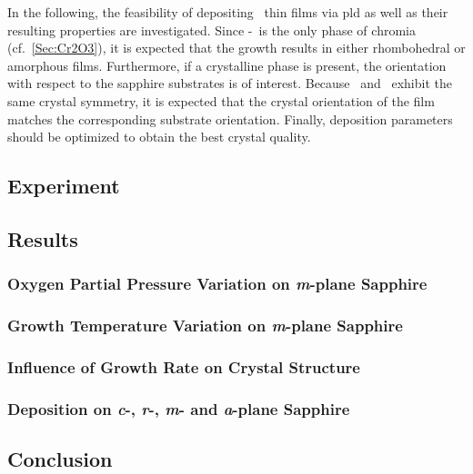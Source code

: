 In the following, the feasibility of depositing \cro\ thin films via \gls{pld} as well as their resulting properties are investigated.
Since \textalpha-\cro\ is the only phase of chromia (cf.~\ref{Sec:Cr2O3}), it is expected that the growth results in either rhombohedral or amorphous films.
Furthermore, if a crystalline phase is present, the orientation with respect to the sapphire substrates is of interest.
Because \alo\ and \cro\ exhibit the same crystal symmetry, it is expected that the crystal orientation of the film  matches the corresponding substrate orientation.
Finally, deposition parameters should be optimized to obtain the best crystal quality.

\subsection{Experiment}
    

\subsection{Results}
    \subsubsection{Oxygen Partial Pressure Variation on \textit{m}-plane Sapphire}
        
    \subsubsection{Growth Temperature Variation on \textit{m}-plane Sapphire}
        
    \subsubsection{Influence of Growth Rate on Crystal Structure}
        
    \subsubsection{Deposition on \textit{c}-, \textit{r}-, \textit{m}- and \textit{a}-plane Sapphire}
        

\subsection{Conclusion}
    
